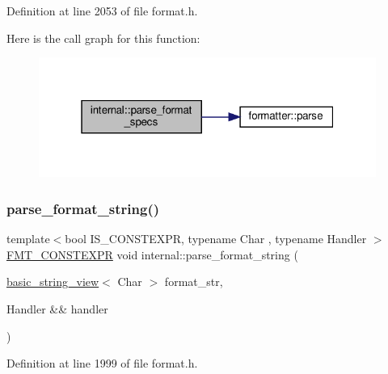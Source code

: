 Definition at line 2053 of file format.\+h.

Here is the call graph for this function\+:
\nopagebreak
\begin{figure}[H]
\begin{center}
\leavevmode
\includegraphics[width=313pt]{namespaceinternal_ac21f85f51ec37023df70a5a8288130d7_cgraph}
\end{center}
\end{figure}
\mbox{\label{namespaceinternal_a47fffd25c13670b8e2eb6559caeef974}} 
\subsubsection{\texorpdfstring{parse\+\_\+format\+\_\+string()}{parse\_format\_string()}}
{\footnotesize\ttfamily template$<$bool I\+S\+\_\+\+C\+O\+N\+S\+T\+E\+X\+PR, typename Char , typename Handler $>$ \\
\hyperlink{core_8h_a69201cb276383873487bf68b4ef8b4cd}{F\+M\+T\+\_\+\+C\+O\+N\+S\+T\+E\+X\+PR} void internal\+::parse\+\_\+format\+\_\+string (\begin{DoxyParamCaption}\item[{\hyperlink{classbasic__string__view}{basic\+\_\+string\+\_\+view}$<$ Char $>$}]{format\+\_\+str,  }\item[{Handler \&\&}]{handler }\end{DoxyParamCaption})}



Definition at line 1999 of file format.\+h.

